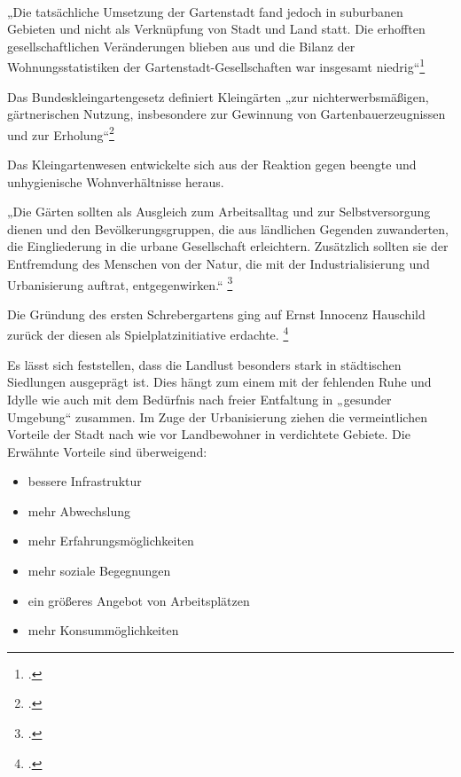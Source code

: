 \documentclass{scrartcl}
\begin{document}
\\
\begin{displayquote}
„Die tatsächliche Umsetzung der Gartenstadt fand jedoch in suburbanen Gebieten und nicht als Verknüpfung von Stadt und Land statt. Die erhofften gesellschaftlichen Veränderungen blieben aus und die Bilanz der Wohnungsstatistiken der Gartenstadt-Gesellschaften war insgesamt niedrig“\footcite[S. 36]{Egnolff2015DieIdeal} 
\end{displayquote}


Das Bundeskleingartengesetz definiert Kleingärten „zur nichterwerbsmäßigen, gärtnerischen Nutzung, insbesondere zur Gewinnung von Gartenbauerzeugnissen und zur Erholung“\footcite[§ 1]{Verbraucherschutz2006BundeskleingartengesetzBKleingG}

Das Kleingartenwesen entwickelte sich aus der Reaktion gegen beengte und unhygienische Wohnverhältnisse heraus. 

\begin{displayquote}
„Die Gärten sollten als Ausgleich zum Arbeitsalltag und zur Selbstversorgung dienen und den Bevölkerungsgruppen, die aus ländlichen Gegenden zuwanderten, die Eingliederung in die urbane Gesellschaft erleichtern. Zusätzlich sollten sie der Entfremdung des Menschen von der Natur, die mit der Industrialisierung
und Urbanisierung auftrat, entgegenwirken.“ \footcite[Vgl.][S. 38]{Egnolff2015DieIdeal}
\end{displayquote} 

Die Gründung des ersten Schrebergartens ging auf Ernst Innocenz Hauschild zurück der diesen als Spielplatzinitiative erdachte. \footcite[Vgl.][S. 39]{Egnolff2015DieIdeal}


Es lässt sich feststellen, dass die Landlust besonders stark in städtischen Siedlungen ausgeprägt ist. Dies hängt zum einem mit der fehlenden Ruhe und Idylle wie auch mit dem Bedürfnis nach freier Entfaltung in „gesunder Umgebung“ zusammen. Im Zuge der Urbanisierung ziehen die vermeintlichen Vorteile der Stadt nach wie vor Landbewohner in verdichtete Gebiete. Die Erwähnte Vorteile sind überweigend: 

\begin{itemize}
\item bessere Infrastruktur
\item mehr Abwechslung
\item mehr Erfahrungsmöglichkeiten 
\item mehr soziale Begegnungen
\item ein größeres Angebot von Arbeitsplätzen
\item mehr Konsummöglichkeiten
\end{itemize}
\end{document}
